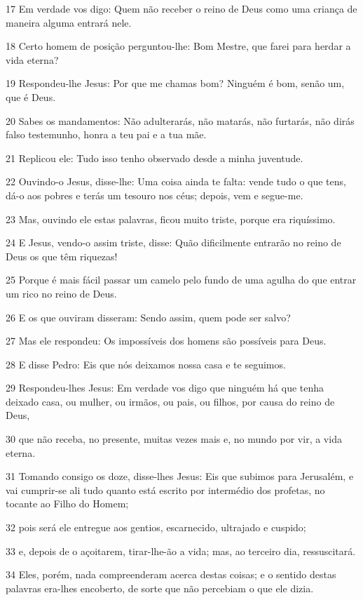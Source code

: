 \par 17 Em verdade vos digo: Quem não receber o reino de Deus como uma criança de maneira alguma entrará nele.
\par 18 Certo homem de posição perguntou-lhe: Bom Mestre, que farei para herdar a vida eterna?
\par 19 Respondeu-lhe Jesus: Por que me chamas bom? Ninguém é bom, senão um, que é Deus.
\par 20 Sabes os mandamentos: Não adulterarás, não matarás, não furtarás, não dirás falso testemunho, honra a teu pai e a tua mãe.
\par 21 Replicou ele: Tudo isso tenho observado desde a minha juventude.
\par 22 Ouvindo-o Jesus, disse-lhe: Uma coisa ainda te falta: vende tudo o que tens, dá-o aos pobres e terás um tesouro nos céus; depois, vem e segue-me.
\par 23 Mas, ouvindo ele estas palavras, ficou muito triste, porque era riquíssimo.
\par 24 E Jesus, vendo-o assim triste, disse: Quão dificilmente entrarão no reino de Deus os que têm riquezas!
\par 25 Porque é mais fácil passar um camelo pelo fundo de uma agulha do que entrar um rico no reino de Deus.
\par 26 E os que ouviram disseram: Sendo assim, quem pode ser salvo?
\par 27 Mas ele respondeu: Os impossíveis dos homens são possíveis para Deus.
\par 28 E disse Pedro: Eis que nós deixamos nossa casa e te seguimos.
\par 29 Respondeu-lhes Jesus: Em verdade vos digo que ninguém há que tenha deixado casa, ou mulher, ou irmãos, ou pais, ou filhos, por causa do reino de Deus,
\par 30 que não receba, no presente, muitas vezes mais e, no mundo por vir, a vida eterna.
\par 31 Tomando consigo os doze, disse-lhes Jesus: Eis que subimos para Jerusalém, e vai cumprir-se ali tudo quanto está escrito por intermédio dos profetas, no tocante ao Filho do Homem;
\par 32 pois será ele entregue aos gentios, escarnecido, ultrajado e cuspido;
\par 33 e, depois de o açoitarem, tirar-lhe-ão a vida; mas, ao terceiro dia, ressuscitará.
\par 34 Eles, porém, nada compreenderam acerca destas coisas; e o sentido destas palavras era-lhes encoberto, de sorte que não percebiam o que ele dizia.
